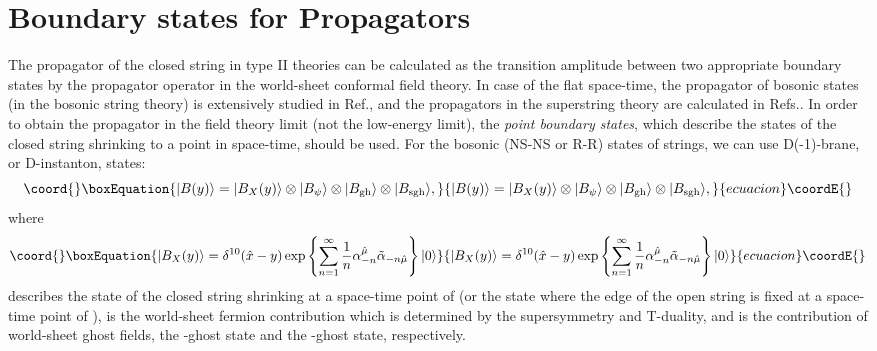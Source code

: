 \documentclass[a4paper,prd,preprint]{revtex4}
\begin{document}
\section{Boundary states for Propagators}
\label{sec:boundary}

The propagator of the closed string in type II theories
 can be calculated as the transition amplitude
 between two appropriate boundary states
 by the propagator operator
 in the world-sheet conformal field theory.
In case of the flat space-time,
 the propagator of bosonic states (in the bosonic string theory)
 is extensively studied in Ref.\cite{CMNP},
 and the propagators in the superstring theory
 are calculated in Refs.\cite{Fainberg-Marshakov,Marshakov}.
In order to obtain the propagator
 in the field theory limit (not the low-energy limit),
 the {\it point boundary states},
 which describe the states of the closed string
 shrinking to a point in space-time,
 should be used.
For the bosonic (NS-NS or R-R) states of strings,
 we can use D(-1)-brane, or D-instanton, states\cite{DFPSLR}:
\begin{equation}\coord{}\boxEquation{
 | B(y) \rangle = | B_X(y) \rangle
                \otimes | B_\psi \rangle
                \otimes  | B_{\rm gh} \rangle
                \otimes | B_{\rm sgh} \rangle,
}{
 | B(y) \rangle = | B_X(y) \rangle
                \otimes | B_\psi \rangle
                \otimes  | B_{\rm gh} \rangle
                \otimes | B_{\rm sgh} \rangle,
}{ecuacion}\coordE{}\end{equation}
 where
\begin{equation}\coord{}\boxEquation{
 | B_X(y) \rangle
 = \delta^{10} ({\hat x}-y)
   \exp \left\{
    {\sum_{n=1}^\infty {1 \over n}
     \alpha^{\hat \mu}_{-n} {\tilde \alpha}_{-n {\hat \mu}}} \right\}
   | 0 \rangle
\label{B_X}
}{
 | B_X(y) \rangle
 = \delta^{10} ({\hat x}-y)
   \exp \left\{
    {\sum_{n=1}^\infty {1 \over n}
     \alpha^{\hat \mu}_{-n} {\tilde \alpha}_{-n {\hat \mu}}} \right\}
   | 0 \rangle
}{ecuacion}\coordE{}\end{equation}
 describes the state of the closed string
 shrinking at a space-time point of \coordHE{} 
 (or the state where the edge of the open string
 is fixed at a space-time point of \coordHE{}),
 \coordHE{} is the world-sheet fermion contribution
 which is determined by the supersymmetry and T-duality,
 and \coordHE{}
 is the contribution of world-sheet ghost fields,
 the \coordHE{}-ghost state and the \myHighlight{$\beta\gamma$}\coordHE{}-ghost state, respectively.
\end{document}
